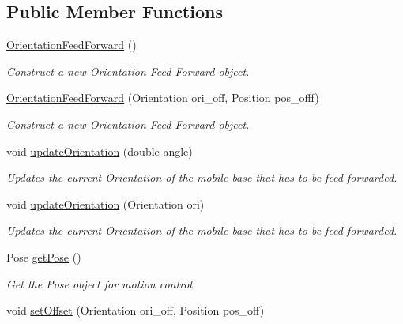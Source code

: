 \subsection*{Public Member Functions}
\begin{DoxyCompactItemize}
\item 
\mbox{\label{classOrientationFeedForward_aad82bda1b9fa824e321a6c8afad84973}} 
\hyperlink{classOrientationFeedForward_aad82bda1b9fa824e321a6c8afad84973}{Orientation\+Feed\+Forward} ()
\begin{DoxyCompactList}\small\item\em Construct a new Orientation Feed Forward object. \end{DoxyCompactList}\item 
\hyperlink{classOrientationFeedForward_a8b4fc8cb74ff3ab16db1a7ed706789aa}{Orientation\+Feed\+Forward} (Orientation ori\+\_\+off, Position pos\+\_\+offf)
\begin{DoxyCompactList}\small\item\em Construct a new Orientation Feed Forward object. \end{DoxyCompactList}\item 
void \hyperlink{classOrientationFeedForward_aa7d8913f8f9d90e913b478d9adc5ff20}{update\+Orientation} (double angle)
\begin{DoxyCompactList}\small\item\em Updates the current Orientation of the mobile base that has to be feed forwarded. \end{DoxyCompactList}\item 
void \hyperlink{classOrientationFeedForward_aed8f826976135c0cd55408a652993828}{update\+Orientation} (Orientation ori)
\begin{DoxyCompactList}\small\item\em Updates the current Orientation of the mobile base that has to be feed forwarded. \end{DoxyCompactList}\item 
Pose \hyperlink{classOrientationFeedForward_ad31fce2cdf39cbf375457b9aa7ca2219}{get\+Pose} ()
\begin{DoxyCompactList}\small\item\em Get the Pose object for motion control. \end{DoxyCompactList}\item 
void \hyperlink{classOrientationFeedForward_a0ff81c38575a903c4d54d1f84abc8c66}{set\+Offset} (Orientation ori\+\_\+off, Position pos\+\_\+off)

\end{DoxyCompactItemize}
